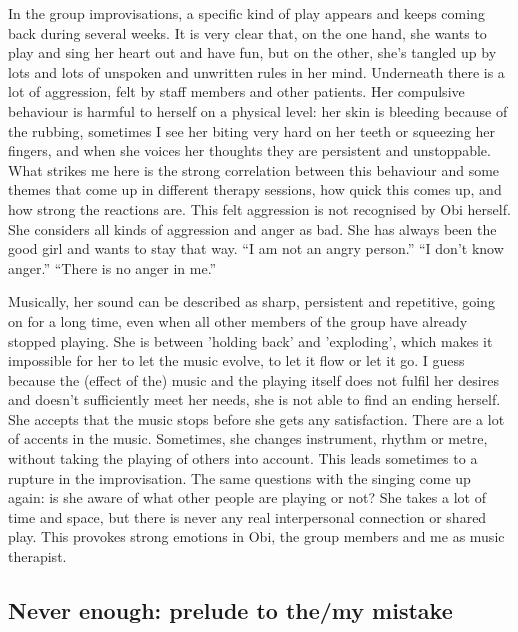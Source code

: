 \documentclass[authordate, empirical, issue]{jote-new-article}
\begin{document}
In the group improvisations, a specific kind of play appears and keeps coming back during several weeks. It is very clear that, on the one hand, she wants to play and sing her heart out and have fun, but on the other, she's tangled up by lots and lots of unspoken and unwritten rules in her mind. Underneath there is a lot of aggression, felt by staff members and other patients. Her compulsive behaviour is harmful to herself on a physical level: her skin is bleeding because of the rubbing, sometimes I see her biting very hard on her teeth or squeezing her fingers, and when she voices her thoughts they are persistent and unstoppable. What strikes me here is the strong correlation between this behaviour and some themes that come up in different therapy sessions, how quick this comes up, and how strong the reactions are. This felt aggression is not recognised by Obi herself. She considers all kinds of aggression and anger as bad. She has always been the good girl and wants to stay that way. “I am not an angry person.” “I don't know anger.” “There is no anger in me.”



Musically, her sound can be described as sharp, persistent and repetitive, going on for a long time, even when all other members of the group have already stopped playing. She is between 'holding back' and 'exploding', which makes it impossible for her to let the music evolve, to let it flow or let it go. I guess because the (effect of the) music and the playing itself does not fulfil her desires and doesn't sufficiently meet her needs, she is not able to find an ending herself. She accepts that the music stops before she gets any satisfaction. There are a lot of accents in the music. Sometimes, she changes instrument, rhythm or metre, without taking the playing of others into account. This leads sometimes to a rupture in the improvisation. The same questions with the singing come up again: is she aware of what other people are playing or not? She takes a lot of time and space, but there is never any real interpersonal connection or shared play. This provokes strong emotions in Obi, the group members and me as music therapist.







\subsection{Never enough: prelude to the/my mistake}
\end{document}
